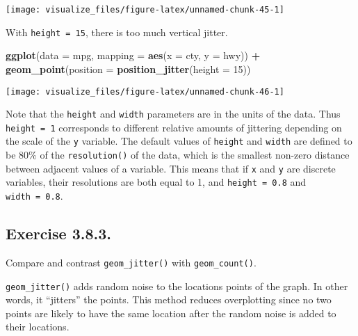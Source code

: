 \documentclass[]{book}
\newenvironment{Shaded}{\begin{snugshade}}{\end{snugshade}}
\newcommand{\DataTypeTok}[1]{\textcolor[rgb]{0.13,0.29,0.53}{#1}}
\newcommand{\DecValTok}[1]{\textcolor[rgb]{0.00,0.00,0.81}{#1}}
\newcommand{\KeywordTok}[1]{\textcolor[rgb]{0.13,0.29,0.53}{\textbf{#1}}}
\newcommand{\NormalTok}[1]{#1}
\newcommand{\OperatorTok}[1]{\textcolor[rgb]{0.81,0.36,0.00}{\textbf{#1}}}
\newcommand{\StringTok}[1]{\textcolor[rgb]{0.31,0.60,0.02}{#1}}
\theoremstyle{plain}
\theoremstyle{remark}
\begin{document}
\begin{center}\texttt{[image: visualize\_files/figure-latex/unnamed-chunk-45-1]} \end{center}

With \texttt{height\ =\ 15}, there is too much vertical jitter.

\begin{Shaded}
\begin{Highlighting}[]
\KeywordTok{ggplot}\NormalTok{(}\DataTypeTok{data =}\NormalTok{ mpg, }\DataTypeTok{mapping =} \KeywordTok{aes}\NormalTok{(}\DataTypeTok{x =}\NormalTok{ cty, }\DataTypeTok{y =}\NormalTok{ hwy)) }\OperatorTok{+}
\StringTok{  }\KeywordTok{geom_point}\NormalTok{(}\DataTypeTok{position =} \KeywordTok{position_jitter}\NormalTok{(}\DataTypeTok{height =} \DecValTok{15}\NormalTok{))}
\end{Highlighting}
\end{Shaded}

\begin{center}\texttt{[image: visualize\_files/figure-latex/unnamed-chunk-46-1]} \end{center}

Note that the \texttt{height} and \texttt{width} parameters are in the
units of the data. Thus \texttt{height\ =\ 1} corresponds to different
relative amounts of jittering depending on the scale of the \texttt{y}
variable. The default values of \texttt{height} and \texttt{width} are
defined to be 80\% of the \texttt{resolution()} of the data, which is
the smallest non-zero distance between adjacent values of a variable.
This means that if \texttt{x} and \texttt{y} are discrete variables,
their resolutions are both equal to 1, and \texttt{height\ =\ 0.8} and
\texttt{width\ =\ 0.8}.

\hypertarget{exercise-3.8.3.}{%
\subsection*{\texorpdfstring{Exercise
{3.8.3}.}{Exercise 3.8.3.}}\label{exercise-3.8.3.}}

Compare and contrast \texttt{geom\_jitter()} with
\texttt{geom\_count()}.

\texttt{geom\_jitter()} adds random noise to the locations points of the
graph. In other words, it ``jitters'' the points. This method reduces
overplotting since no two points are likely to have the same location
after the random noise is added to their locations.
\end{document}
